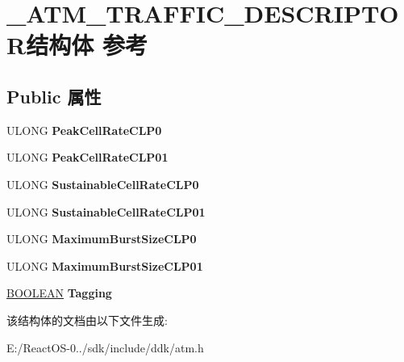 \hypertarget{struct___a_t_m___t_r_a_f_f_i_c___d_e_s_c_r_i_p_t_o_r}{}\section{\+\_\+\+A\+T\+M\+\_\+\+T\+R\+A\+F\+F\+I\+C\+\_\+\+D\+E\+S\+C\+R\+I\+P\+T\+O\+R结构体 参考}
\label{struct___a_t_m___t_r_a_f_f_i_c___d_e_s_c_r_i_p_t_o_r}
\subsection*{Public 属性}
\begin{DoxyCompactItemize}
\item 
\mbox{\label{struct___a_t_m___t_r_a_f_f_i_c___d_e_s_c_r_i_p_t_o_r_a4aa1a19f03731453c5dc80f440d0a5e5}} 
U\+L\+O\+NG {\bfseries Peak\+Cell\+Rate\+C\+L\+P0}
\item 
\mbox{\label{struct___a_t_m___t_r_a_f_f_i_c___d_e_s_c_r_i_p_t_o_r_adaf9801481c7693110238824b89cc240}} 
U\+L\+O\+NG {\bfseries Peak\+Cell\+Rate\+C\+L\+P01}
\item 
\mbox{\label{struct___a_t_m___t_r_a_f_f_i_c___d_e_s_c_r_i_p_t_o_r_a4f861ff034dfd41ad2cf536ef42875b7}} 
U\+L\+O\+NG {\bfseries Sustainable\+Cell\+Rate\+C\+L\+P0}
\item 
\mbox{\label{struct___a_t_m___t_r_a_f_f_i_c___d_e_s_c_r_i_p_t_o_r_af6d319a957eca8b8dedadd3aaedba306}} 
U\+L\+O\+NG {\bfseries Sustainable\+Cell\+Rate\+C\+L\+P01}
\item 
\mbox{\label{struct___a_t_m___t_r_a_f_f_i_c___d_e_s_c_r_i_p_t_o_r_a65163e839f5377468ecb29e0e03a7176}} 
U\+L\+O\+NG {\bfseries Maximum\+Burst\+Size\+C\+L\+P0}
\item 
\mbox{\label{struct___a_t_m___t_r_a_f_f_i_c___d_e_s_c_r_i_p_t_o_r_a8e11b936b2f722eca5249d769004f4cf}} 
U\+L\+O\+NG {\bfseries Maximum\+Burst\+Size\+C\+L\+P01}
\item 
\mbox{\label{struct___a_t_m___t_r_a_f_f_i_c___d_e_s_c_r_i_p_t_o_r_a5f0e54e20dd291a9beac16d7638da968}} 
\hyperlink{_processor_bind_8h_a112e3146cb38b6ee95e64d85842e380a}{B\+O\+O\+L\+E\+AN} {\bfseries Tagging}
\end{DoxyCompactItemize}


该结构体的文档由以下文件生成\+:\begin{DoxyCompactItemize}
\item 
E\+:/\+React\+O\+S-\/0../sdk/include/ddk/atm.\+h\end{DoxyCompactItemize}
